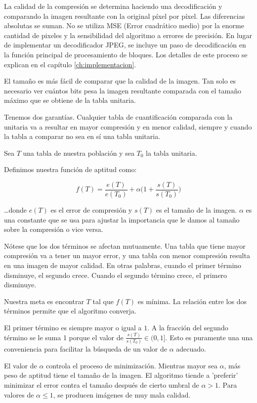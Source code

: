 La calidad de la compresión se determina haciendo una decodificación y
comparando la imagen resultante con la original píxel por píxel. Las
diferencias absolutas se suman. No se utiliza MSE (Error cuadrático medio) por
la enorme cantidad de pixeles y la sensibilidad del algoritmo a errores de
precisión. En lugar de implementar un decodificador JPEG, se incluye un paso de
decodificación en la función principal de procesamiento de bloques. Los
detalles de este proceso se explican en el capítulo \ref{ch:implementacion}.

El tamaño es más fácil de comparar que la calidad de la imagen. Tan solo es
necesario ver cuántos bits pesa la imagen resultante comparada con el tamaño
máximo que se obtiene de la tabla unitaria.

Tenemos dos garantías. Cualquier tabla de cuantificación comparada con la
unitaria va a resultar en mayor compresión y en menor calidad, siempre y cuando
la tabla a comparar no sea en sí una tabla unitaria.

Sea $T$ una tabla de nuestra población y sea $T_0$ la tabla unitaria.

Definimos nuestra función de aptitud como:

\begin{equation}
f(T) = \frac{e(T)}{e(T_0)} + \alpha \Big(1 + \frac{s(T)}{s(T_0)}\Big)
\end{equation}\label{eq:fitness}

\dots donde $e(T)$ es el error de compresión y $s(T)$ es el tamaño de la
imagen. $\alpha$ es una constante que se usa para ajustar la importancia que le
damos al tamaño sobre la compresión o vice versa.

Nótese que los dos términos se afectan mutuamente. Una tabla que tiene mayor
compresión va a tener un mayor error, y una tabla con menor compresión resulta
en una imagen de mayor calidad. En otras palabras, cuando el primer término
disminuye, el segundo crece.  Cuando el segundo término crece, el primero
disminuye.

Nuestra meta es encontrar $T$ tal que $f(T)$ es mínima. La relación entre los
dos términos permite que el algoritmo converja.

El primer término es siempre mayor o igual a $1$. A la fracción del segundo
término se le suma 1 porque el valor de $\frac{s(T)}{s(T_0)} \in (0, 1]$. Esto
es puramente una una conveniencia para facilitar la búsqueda de un valor de
$\alpha$ adecuado.

El valor de $\alpha$ controla el proceso de minimización. Mientras mayor sea
$\alpha$, más peso de aptitud tiene el tamaño de la imagen. El algoritmo tiende
a 'preferir' minimizar el error contra el tamaño después de cierto umbral de
$\alpha > 1$. Para valores de $\alpha \leq 1$, se producen imágenes de muy mala
calidad.

